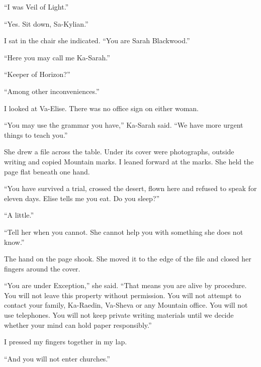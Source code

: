 ``I was Veil of Light.''\par

``Yes. Sit down, Sa-Kylian.''\par

I sat in the chair she indicated. ``You are Sarah Blackwood.''\par

``Here you may call me Ka-Sarah.''\par

``Keeper of Horizon?''\par

``Among other inconveniences.''\par

I looked at Va-Elise. There was no office sign on either woman.\par

``You may use the grammar you have,'' Ka-Sarah said. ``We have more urgent things to teach you.''\par

She drew a file across the table. Under its cover were photographs, outside writing and copied Mountain marks. I leaned forward at the marks. She held the page flat beneath one hand.\par

``You have survived a trial, crossed the desert, flown here and refused to speak for eleven days. Elise tells me you eat. Do you sleep?''\par

``A little.''\par

``Tell her when you cannot. She cannot help you with something she does not know.''\par

The hand on the page shook. She moved it to the edge of the file and closed her fingers around the cover.\par

``You are under Exception,'' she said. ``That means you are alive by procedure. You will not leave this property without permission. You will not attempt to contact your family, Ka-Raedin, Va-Sheva or any Mountain office. You will not use telephones. You will not keep private writing materials until we decide whether your mind can hold paper responsibly.''\par

I pressed my fingers together in my lap.\par

``And you will not enter churches.''\par

